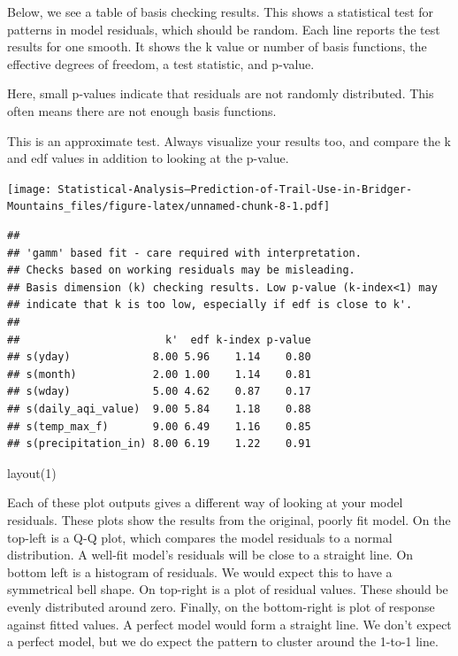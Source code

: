 \documentclass[
]{book}
\newenvironment{Shaded}{\begin{snugshade}}{\end{snugshade}}
\newcommand{\AttributeTok}[1]{\textcolor[rgb]{0.77,0.63,0.00}{#1}}
\newcommand{\CommentTok}[1]{\textcolor[rgb]{0.56,0.35,0.01}{\textit{#1}}}
\newcommand{\DecValTok}[1]{\textcolor[rgb]{0.00,0.00,0.81}{#1}}
\newcommand{\FunctionTok}[1]{\textcolor[rgb]{0.00,0.00,0.00}{#1}}
\newcommand{\NormalTok}[1]{#1}
\newcommand{\SpecialCharTok}[1]{\textcolor[rgb]{0.00,0.00,0.00}{#1}}
\begin{document}
Below, we see a table of basis checking results. This shows a statistical test for patterns in model residuals, which should be random. Each line reports the test results for one smooth. It shows the k value or number of basis functions, the effective degrees of freedom, a test statistic, and p-value.

Here, small p-values indicate that residuals are not randomly distributed. This often means there are not enough basis functions.

This is an approximate test. Always visualize your results too, and compare the k and edf values in addition to looking at the p-value.

\begin{Shaded}
\end{Shaded}

\texttt{[image: Statistical-Analysis--Prediction-of-Trail-Use-in-Bridger-Mountains\_files/figure-latex/unnamed-chunk-8-1.pdf]}

\begin{verbatim}
## 
## 'gamm' based fit - care required with interpretation.
## Checks based on working residuals may be misleading.
## Basis dimension (k) checking results. Low p-value (k-index<1) may
## indicate that k is too low, especially if edf is close to k'.
## 
##                       k'  edf k-index p-value
## s(yday)             8.00 5.96    1.14    0.80
## s(month)            2.00 1.00    1.14    0.81
## s(wday)             5.00 4.62    0.87    0.17
## s(daily_aqi_value)  9.00 5.84    1.18    0.88
## s(temp_max_f)       9.00 6.49    1.16    0.85
## s(precipitation_in) 8.00 6.19    1.22    0.91
\end{verbatim}

\begin{Shaded}
\begin{Highlighting}[]
\FunctionTok{layout}\NormalTok{(}\DecValTok{1}\NormalTok{)}
\end{Highlighting}
\end{Shaded}

Each of these plot outputs gives a different way of looking at your model residuals. These plots show the results from the original, poorly fit model. On the top-left is a Q-Q plot, which compares the model residuals to a normal distribution. A well-fit model's residuals will be close to a straight line. On bottom left is a histogram of residuals. We would expect this to have a symmetrical bell shape. On top-right is a plot of residual values. These should be evenly distributed around zero. Finally, on the bottom-right is plot of response against fitted values. A perfect model would form a straight line. We don't expect a perfect model, but we do expect the pattern to cluster around the 1-to-1 line.
\end{document}
